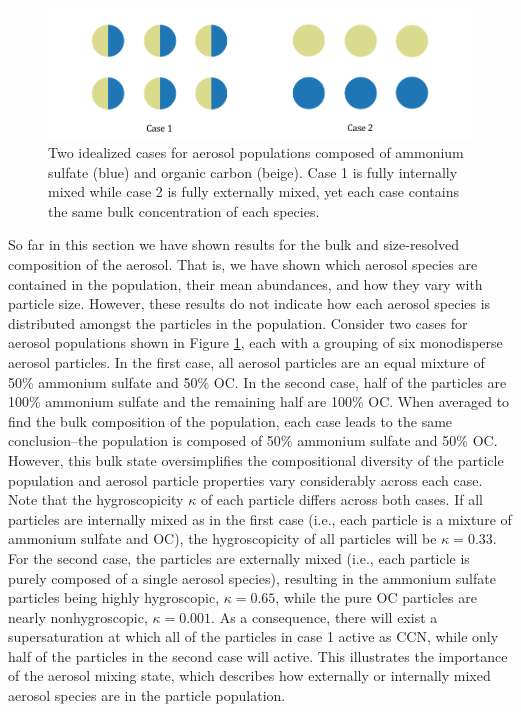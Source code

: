 \begin{figure}[!t]
  \centering
    \includegraphics[width=\textwidth]{figures/chapter5/mixing-state-ideal-cases.pdf}
    \caption{Two idealized cases for aerosol populations composed of ammonium sulfate (blue) and organic carbon (beige). Case 1 is fully internally mixed while case 2 is fully externally mixed, yet each case contains the same bulk concentration of each species.}
    \label{fig:mixing-state-scenarios}
\end{figure}

So far in this section we have shown results for the bulk and size-resolved composition of the aerosol. That is, we have shown which aerosol species are contained in the population, their mean abundances, and how they vary with particle size. However, these results do not indicate how each aerosol species is distributed amongst the particles in the population. Consider two cases for aerosol populations shown in Figure \ref{fig:mixing-state-scenarios}, each with a grouping of six monodisperse aerosol particles. In the first case, all aerosol particles are an equal mixture of 50\% ammonium sulfate and 50\% OC. In the second case, half of the particles are 100\% ammonium sulfate and the remaining half are 100\% OC. When averaged to find the bulk composition of the population, each case leads to the same conclusion--the population is composed of 50\% ammonium sulfate and 50\% OC. However, this bulk state oversimplifies the compositional diversity of the particle population and aerosol particle properties vary considerably across each case. Note that the hygroscopicity $\kappa$ of each particle differs across both cases. If all particles are internally mixed as in the first case (i.e., each particle is a mixture of ammonium sulfate and OC), the hygroscopicity of all particles will be $\kappa=0.33$. For the second case, the particles are externally mixed (i.e., each particle is purely composed of a single aerosol species), resulting in the ammonium sulfate particles being highly hygroscopic, $\kappa=0.65$, while the pure OC particles are nearly nonhygroscopic, $\kappa=0.001$. As a consequence, there will exist a supersaturation at which all of the particles in case 1 active as CCN, while only half of the particles in the second case will active. This illustrates the importance of the aerosol mixing state, which describes how externally or internally mixed aerosol species are in the particle population. 

